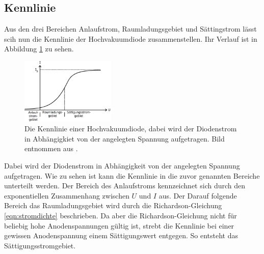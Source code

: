 \subsection{Kennlinie}
Aus den drei Bereichen Anlaufstrom, Raumladungsgebiet und Sättingstrom lässt scih nun die Kennlinie der Hochvakuumdiode zusammenstellen.
Ihr Verlauf ist in Abbildung \ref{fig:kennlinie} zu sehen.
\begin{figure}
    \centering
    \includegraphics[width=0.4\textwidth]{content/data/kennlinie.png}
    \caption{Die Kennlinie einer Hochvakuumdiode, dabei wird der Diodenstrom in Abhängigkiet von der angelegten Spannung aufgetragen. Bild entnommen aus \cite[9]{anleitung}.}
    \label{fig:kennlinie}
\end{figure}
Dabei wird der Diodenstrom in Abhängigkeit von der angelegten Spannung aufgetragen.
Wie zu sehen ist kann die Kennlinie in die zuvor genannten Bereiche unterteilt werden.
Der Bereich des Anlaufstroms kennzeichnet sich durch den exponentiellen Zusammenhang zwischen $U$ und $I$ aus.
Der Darauf folgende Bereich das Raumladungsgebiet wird durch die Richardson-Gleichung \eqref{eqn:stromdichte} beschrieben.
Da aber die Richardson-Gleichung nicht für beliebig hohe Anodenspannungen gültig ist, strebt die Kennlinie bei einer gewissen Anodenspannung einem Sättigungswert entgegen.
So entsteht das Sättigungsstromgebiet.
